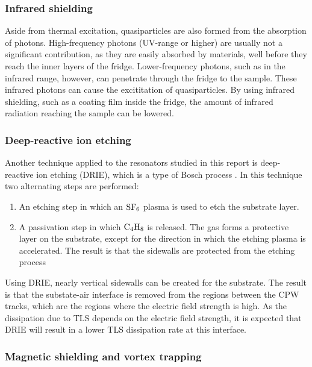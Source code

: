   \subsubsection{Infrared shielding}

  Aside from thermal excitation, quasiparticles are also formed from the absorption of photons. High-frequency photons (UV-range or higher) are usually not a significant contribution, as they are easily absorbed by materials, well before they reach the inner layers of the fridge. Lower-frequency photons, such as in the infrared range, however, can penetrate through the fridge to the sample. These infrared photons can cause the excititation of quasiparticles. By using infrared shielding, such as a coating film inside the fridge, the amount of infrared radiation reaching the sample can be lowered.



  \subsubsection{Deep-reactive ion etching}

  Another technique applied to the resonators studied in this report is deep-reactive ion etching (DRIE), which is a type of Bosch process \cite{bruno2015reducing}. In this technique two alternating steps are performed:

  \begin{enumerate}
      \item An etching step in which an $\mathrm{SF_6}$ plasma is used to etch the substrate layer.
      \item A passivation step in which $\mathrm{C_4H_8}$ is released. The gas forms a protective layer on the substrate, except for the direction in which the etching plasma is accelerated. The result is that the sidewalls are protected from the etching process
  \end{enumerate}

  Using DRIE, nearly vertical sidewalls can be created for the substrate. The result is that the substate-air interface is removed from the regions between the CPW tracks, which are the regions where the electric field strength is high. As the dissipation due to TLS depends on the electric field strength, it is expected that DRIE will result in a lower TLS dissipation rate at this interface.

  \subsubsection{Magnetic shielding and vortex trapping}

